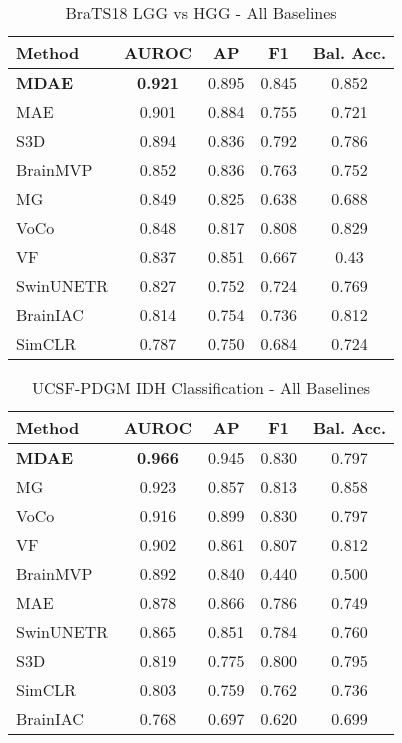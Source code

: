 \begin{table}[h!]
\centering
\caption{BraTS18 LGG vs HGG - All Baselines}
\begin{tabular}{lcccc}
\hline
Method & AUROC & AP & F1 & Bal. Acc. \\
\hline
\textbf{MDAE} & \textbf{0.921} & 0.895 & 0.845 & 0.852 \\
MAE & 0.901 & 0.884 & 0.755 & 0.721 \\
S3D & 0.894 & 0.836 & 0.792 & 0.786 \\
BrainMVP & 0.852 & 0.836 & 0.763 & 0.752 \\
MG & 0.849 & 0.825 & 0.638 & 0.688 \\
VoCo & 0.848 & 0.817 & 0.808 & 0.829 \\
VF & 0.837 & 0.851 & 0.667 & 0.43 \\
SwinUNETR & 0.827 & 0.752 & 0.724 & 0.769 \\
BrainIAC & 0.814 & 0.754 & 0.736 & 0.812 \\
SimCLR & 0.787 & 0.750 & 0.684 & 0.724 \\
\hline
\end{tabular}
\end{table}


\begin{table}[h!]
\centering
\caption{UCSF-PDGM IDH Classification - All Baselines}
\begin{tabular}{lcccc}
\hline
Method & AUROC & AP & F1 & Bal. Acc. \\
\hline
\textbf{MDAE} & \textbf{0.966} & 0.945 & 0.830 & 0.797 \\
MG & 0.923 & 0.857 & 0.813 & 0.858 \\
VoCo & 0.916 & 0.899 & 0.830 & 0.797 \\
VF & 0.902 & 0.861 & 0.807 & 0.812 \\
BrainMVP & 0.892 & 0.840 & 0.440 & 0.500 \\
MAE & 0.878 & 0.866 & 0.786 & 0.749 \\
SwinUNETR & 0.865 & 0.851 & 0.784 & 0.760 \\
S3D & 0.819 & 0.775 & 0.800 & 0.795 \\
SimCLR & 0.803 & 0.759 & 0.762 & 0.736 \\
BrainIAC & 0.768 & 0.697 & 0.620 & 0.699 \\
\hline
\end{tabular}
\end{table}
